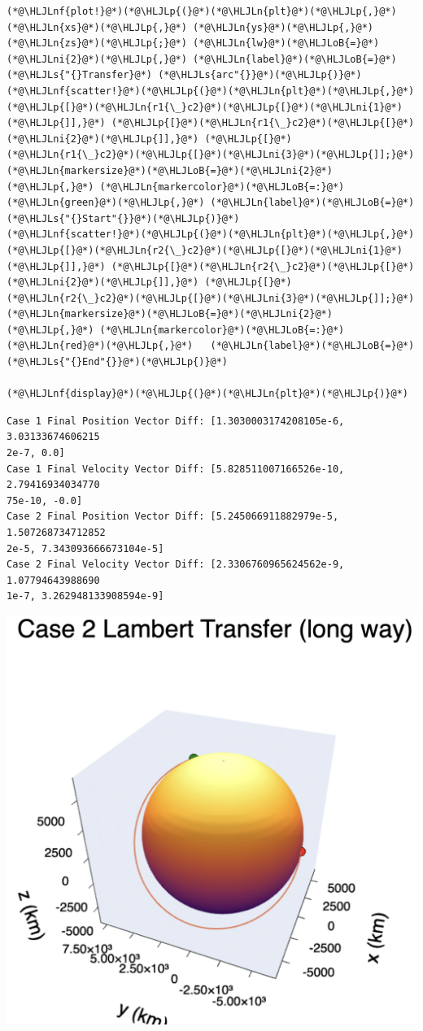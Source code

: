 \documentclass[12pt,a4paper]{article}
\newcommand{\HLJLn}[1]{#1}
\newcommand{\HLJLnf}[1]{\textcolor[RGB]{66,102,213}{#1}}
\newcommand{\HLJLs}[1]{\textcolor[RGB]{201,61,57}{#1}}
\newcommand{\HLJLni}[1]{\textcolor[RGB]{59,151,46}{#1}}
\newcommand{\HLJLoB}[1]{\textcolor[RGB]{102,102,102}{\textbf{#1}}}
\newcommand{\HLJLp}[1]{#1}
\begin{document}
\begin{lstlisting}
(*@\HLJLnf{plot!}@*)(*@\HLJLp{(}@*)(*@\HLJLn{plt}@*)(*@\HLJLp{,}@*) (*@\HLJLn{xs}@*)(*@\HLJLp{,}@*) (*@\HLJLn{ys}@*)(*@\HLJLp{,}@*) (*@\HLJLn{zs}@*)(*@\HLJLp{;}@*) (*@\HLJLn{lw}@*)(*@\HLJLoB{=}@*)(*@\HLJLni{2}@*)(*@\HLJLp{,}@*) (*@\HLJLn{label}@*)(*@\HLJLoB{=}@*)(*@\HLJLs{"{}Transfer}@*) (*@\HLJLs{arc"{}}@*)(*@\HLJLp{)}@*)
(*@\HLJLnf{scatter!}@*)(*@\HLJLp{(}@*)(*@\HLJLn{plt}@*)(*@\HLJLp{,}@*) (*@\HLJLp{[}@*)(*@\HLJLn{r1{\_}c2}@*)(*@\HLJLp{[}@*)(*@\HLJLni{1}@*)(*@\HLJLp{]],}@*) (*@\HLJLp{[}@*)(*@\HLJLn{r1{\_}c2}@*)(*@\HLJLp{[}@*)(*@\HLJLni{2}@*)(*@\HLJLp{]],}@*) (*@\HLJLp{[}@*)(*@\HLJLn{r1{\_}c2}@*)(*@\HLJLp{[}@*)(*@\HLJLni{3}@*)(*@\HLJLp{]];}@*) (*@\HLJLn{markersize}@*)(*@\HLJLoB{=}@*)(*@\HLJLni{2}@*)(*@\HLJLp{,}@*) (*@\HLJLn{markercolor}@*)(*@\HLJLoB{=:}@*)(*@\HLJLn{green}@*)(*@\HLJLp{,}@*) (*@\HLJLn{label}@*)(*@\HLJLoB{=}@*)(*@\HLJLs{"{}Start"{}}@*)(*@\HLJLp{)}@*)
(*@\HLJLnf{scatter!}@*)(*@\HLJLp{(}@*)(*@\HLJLn{plt}@*)(*@\HLJLp{,}@*) (*@\HLJLp{[}@*)(*@\HLJLn{r2{\_}c2}@*)(*@\HLJLp{[}@*)(*@\HLJLni{1}@*)(*@\HLJLp{]],}@*) (*@\HLJLp{[}@*)(*@\HLJLn{r2{\_}c2}@*)(*@\HLJLp{[}@*)(*@\HLJLni{2}@*)(*@\HLJLp{]],}@*) (*@\HLJLp{[}@*)(*@\HLJLn{r2{\_}c2}@*)(*@\HLJLp{[}@*)(*@\HLJLni{3}@*)(*@\HLJLp{]];}@*) (*@\HLJLn{markersize}@*)(*@\HLJLoB{=}@*)(*@\HLJLni{2}@*)(*@\HLJLp{,}@*) (*@\HLJLn{markercolor}@*)(*@\HLJLoB{=:}@*)(*@\HLJLn{red}@*)(*@\HLJLp{,}@*)   (*@\HLJLn{label}@*)(*@\HLJLoB{=}@*)(*@\HLJLs{"{}End"{}}@*)(*@\HLJLp{)}@*)

(*@\HLJLnf{display}@*)(*@\HLJLp{(}@*)(*@\HLJLn{plt}@*)(*@\HLJLp{)}@*)
\end{lstlisting}

\begin{lstlisting}
Case 1 Final Position Vector Diff: [1.3030003174208105e-6, 3.03133674606215
2e-7, 0.0]
Case 1 Final Velocity Vector Diff: [5.828511007166526e-10, 2.79416934034770
75e-10, -0.0]
Case 2 Final Position Vector Diff: [5.245066911882979e-5, 1.507268734712852
2e-5, 7.343093666673104e-5]
Case 2 Final Velocity Vector Diff: [2.3306760965624562e-9, 1.07794643988690
1e-7, 3.262948133908594e-9]
\end{lstlisting}

\includegraphics[width=\linewidth]{./s02c.png}
\end{document}
